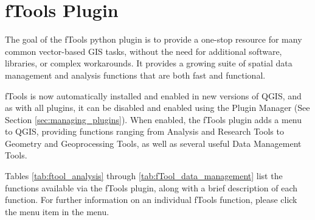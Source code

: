 
\section{fTools Plugin}\label{sec:ftools}


The goal of the fTools python plugin is to provide a one-stop resource for
many common vector-based GIS tasks, without the need for additional software, 
libraries, or complex workarounds. It provides a growing suite of spatial 
data management and analysis functions that are both fast and functional. 

fTools is now automatically installed and enabled in new versions of QGIS, and as with all plugins, it can 
be disabled and enabled using the Plugin Manager (See Section \ref{sec:managing_plugins}).
When enabled, the fTools plugin adds a  menu to QGIS, providing functions ranging from 
Analysis and Research Tools to Geometry and Geoprocessing Tools, as well as several useful Data Management Tools.

\label{ftool_functions}

Tables \ref{tab:ftool_analysis} through \ref{tab:fTool_data_management} list the 
functions available via the fTools plugin, along with a brief description of 
each function. For further information on an individual fTools function, please 
click the  menu item in the  menu.

